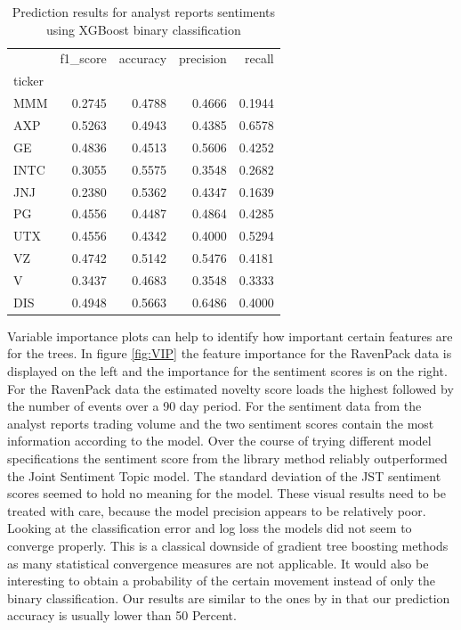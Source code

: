 \begin{table}[h]
\centering
\begin{tabular}{lrrrr}
\toprule
{} &  f1\_score &  accuracy &  precision &    recall \\
ticker &           &           &            &           \\
\midrule
MMM    &  0.2745 &  0.4788 &   0.4666 &  0.1944 \\
AXP    &  0.5263 &  0.4943 &   0.4385 &  0.6578 \\
GE     &  0.4836 &  0.4513 &   0.5606 &  0.4252 \\
INTC   &  0.3055 &  0.5575 &   0.3548 &  0.2682 \\
JNJ    &  0.2380 &  0.5362 &   0.4347 &  0.1639 \\
PG     &  0.4556 &  0.4487 &   0.4864 &  0.4285 \\
UTX    &  0.4556 &  0.4342 &   0.4000 &  0.5294 \\
VZ     &  0.4742 &  0.5142 &   0.5476 &  0.4181 \\
V      &  0.3437 &  0.4683 &   0.3548 &  0.3333 \\
DIS    &  0.4948 &  0.5663 &   0.6486 &  0.4000 \\
\bottomrule
\end{tabular}
    \label{tab:OurSentRes}
    \caption{Prediction results for analyst reports sentiments using XGBoost binary classification}
\end{table}
Variable importance plots can help to identify how important certain features are for the trees. In figure \ref{fig:VIP} the feature importance for the RavenPack data is displayed on the left and the importance for the sentiment scores is on the right. For the RavenPack data the estimated novelty score loads the highest followed by the number of events over a 90 day period. For the sentiment data from the analyst reports trading volume and the two sentiment scores contain the most information according to the model. Over the course of trying different model specifications the sentiment score from the library method reliably outperformed the Joint Sentiment Topic model. The standard deviation of the JST sentiment scores seemed to hold no meaning for the model. These visual results need to be treated with care, because the model precision appears to be relatively poor. Looking at the classification error and log loss the models did not seem to converge properly. This is a classical downside of gradient tree boosting methods as many statistical convergence measures are not applicable. It would also be interesting to obtain a probability of the certain movement instead of only the binary classification. Our results are similar to the ones by \citet{atkins2018financial} in that our prediction accuracy is usually lower than 50 Percent. 
